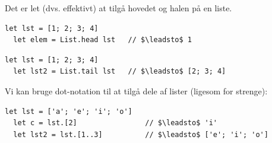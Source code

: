\documentclass[rgb]{beamer}
\begin{document}
\begin{frame}[fragile]
\begin{footnotesize}


Det er let (dvs. effektivt) at tilgå hovedet og halen på en liste.

\vspace{1ex}


\begin{lstlisting}[numbers=none,frame=none,mathescape]
  let lst = [1; 2; 3; 4]
  let elem = List.head lst   // $\leadsto$ 1
\end{lstlisting}


\begin{lstlisting}[numbers=none,frame=none,mathescape]
  let lst = [1; 2; 3; 4]
  let lst2 = List.tail lst   // $\leadsto$ [2; 3; 4]
\end{lstlisting}


\vspace{1ex}

Vi kan bruge dot-notation til at tilgå dele af lister (ligesom
for strenge):

\vspace{1ex}

\begin{lstlisting}[numbers=none,frame=none,mathescape]
  let lst = ['a'; 'e'; 'i'; 'o']
  let c = lst.[2]                // $\leadsto$ 'i'
  let lst2 = lst.[1..3]          // $\leadsto$ ['e'; 'i'; 'o']
\end{lstlisting}
\end{footnotesize}
\end{frame}
\end{document}
